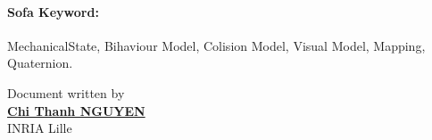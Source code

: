 \documentclass[a4paper,10pt]{article}
\begin{document}
\paragraph{Sofa Keyword: } MechanicalState, Bihaviour Model, Colision Model, Visual Model, Mapping, Quaternion. 


						      \begin{flushright}
						      Document written by \\
						      \href{mailto:chi-thanh.nguyen@inria.fr}{{\textbf {Chi Thanh NGUYEN}}} \\
						      INRIA Lille
						      \end{flushright}
\end{document}
